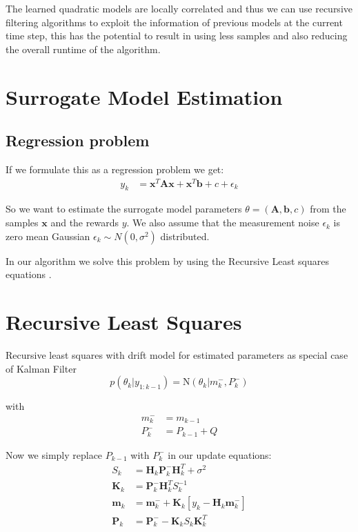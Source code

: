 The learned quadratic models are locally correlated and thus we can use recursive
filtering algorithms to exploit the information of previous models at
the current time step, this has the potential to result in using less samples
and also reducing the overall runtime of the algorithm.

\section{Surrogate Model Estimation}

\subsection{Regression problem}

If we formulate this as a regression problem we get:
\begin{align*}
  y_k &=  \mathbf{x}^T \mathbf{A} \mathbf{x} + \mathbf{x}^T \mathbf{b} + c + \epsilon_k
\end{align*}

So we want to estimate the surrogate model parameters $\theta = (\mathbf{A}, \mathbf{b}, c)$ from the samples $\mathbf{x}$
and the rewards $y$. We also assume that
the measurement noise $\epsilon_k$ is zero mean Gaussian $\epsilon_k \sim N(0, \sigma^2)$ distributed.

In our algorithm we solve this problem by using the Recursive Least squares equations .


\section{Recursive Least Squares}
Recursive least squares with drift model for estimated parameters
as special case of Kalman Filter
$$ p(\theta_k | y_{1:k-1}) = \text{N}(\theta_k | m_k^{-}, P_k^{-}) $$

with
\begin{align}
  m_k^{-} &= m_{k-1} \\
  P_k^{-} &= P_{k-1} + Q
\end{align}

Now we simply replace $P_{k-1}$ with $P_k^{-}$ in our update equations:
\begin{align*}
     S_k &= \textbf{H}_k \textbf{P}_{k}^{-} \textbf{H}^T_k + \sigma^2 \\
     \textbf{K}_k &= \textbf{P}_{k}^{-} \textbf{H}^T_k S_k^{-1} \\
     \textbf{m}_k &= \textbf{m}_{k}^{-} + \textbf{K}_k [y_k - \textbf{H}_k \textbf{m}_{k}^{-}] \\
     \textbf{P}_k &= \textbf{P}_{k}^{-} - \textbf{K}_k S_k \textbf{K}_k^T
\end{align*}

